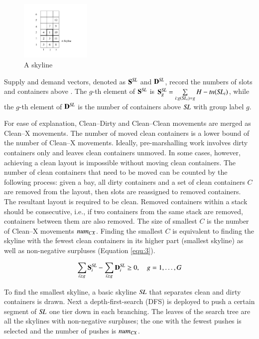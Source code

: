 \documentclass[review,3p,times,authoryear,12pt]{elsarticle}
\begin{document}
\begin{figure}[htbp]
\centering
\includegraphics[width=0.3\textwidth]{fig5.pdf}
\caption{A skyline}
\label{fig5}
\end{figure}

Supply and demand vectors, denoted as $\mathbf S^\id{SL}$ and $\mathbf D^\id{SL}$, record the numbers of slots and containers above . The $g$-th element of $\mathbf S^\id{SL}$ is $\mathbf S^\id{SL}_g=\sum\limits_{i:g(\id{SL}_i)=g}H-\id{tn}(\id{SL}_i)$, while the $g$-th element of $\mathbf D^\id{SL}$ is the number of containers above $\id{SL}$ with group label $g$.

For ease of explanation, Clean--Dirty and Clean--Clean movements are merged as Clean--X movements. The number of moved clean containers is a lower bound of the number of Clean--X movements. Ideally, pre-marshalling work involves dirty containers only and leaves clean containers unmoved. In some cases, however, achieving a clean layout is impossible without moving clean containers. The number of clean containers that need to be moved can be counted by the following process: given a bay, all dirty containers and a set of clean containers $C$ are removed from the layout, then slots are reassigned to removed containers. The resultant layout is required to be clean. Removed containers within a stack should be consecutive, i.e., if two containers from the same stack are removed, containers between them are also removed. The size of smallest $C$ is the number of Clean--X movements $\id{num}_{CX}$. Finding the smallest $C$ is equivalent to finding the skyline with the fewest clean containers in its higher part (smallest skyline) as well as non-negative surpluses (Equation \ref{equ:3}).

\begin{equation}
\label{equ:3}
\sum\limits_{i\ge g}\mathbf S^\id{SL}_i-\sum\limits_{i\ge g}\mathbf D^\id{SL}_i\ge0, \quad g=1,\dots,G
\end{equation}

To find the smallest skyline, a basic skyline $\id{SL}$ that separates clean and dirty containers is drawn. Next a depth-first-search (DFS) is deployed to push a certain segment of $\id{SL}$ one tier down in each branching. The leaves of the search tree are all the skylines with non-negative surpluses; the one with the fewest pushes is selected and the number of pushes is $\id{num}_\id{CX}$.
\end{document}
